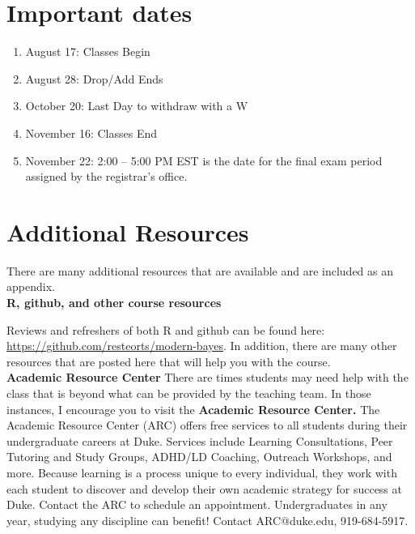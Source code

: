 \documentclass[11pt]{article}
\begin{document}
\section{Important dates}
\begin{enumerate}
\item August 17: Classes Begin
\item August 28: Drop/Add Ends
\item October 20: Last Day to withdraw with a W
\item November 16: Classes End
\item November 22: 2:00 -- 5:00 PM EST is the date for the final exam period assigned by the registrar's office. 
\end{enumerate}



\clearpage
\newpage
\appendix

\section{Additional Resources}
There are many additional resources that are available and are included as an appendix. \\

\textbf{R, github, and other course resources}

Reviews and refreshers of both R and github can be found here: \url{https://github.com/resteorts/modern-bayes}. In addition, there are many other resources that are posted here that will help you with the course. \\


\textbf{Academic Resource Center} There are times students may need help with the class that is beyond what can be provided by the teaching team. In those instances, I encourage you to visit the \textbf{Academic Resource Center.} The Academic Resource Center (ARC) offers free services to all students during their undergraduate careers at Duke. Services include Learning Consultations, Peer Tutoring and Study Groups, ADHD/LD Coaching, Outreach Workshops, and more. Because learning is a process unique to every individual, they work with each student to discover and develop their own academic strategy for success at Duke. Contact the ARC to schedule an appointment. Undergraduates in any year, studying any discipline can benefit! Contact ARC@duke.edu, 919-684-5917.\\
\end{document}
